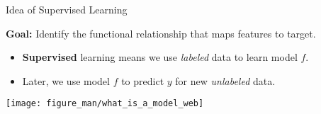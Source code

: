 \documentclass[11pt,compress,t,notes=noshow, xcolor=table]{beamer}
\begin{document}
	
\begin{vbframe}{Idea of Supervised Learning}


\textbf{Goal:} Identify the functional relationship that maps features to target.

\lz

\begin{itemize}

  \item \textbf{Supervised} learning means we use \emph{labeled} data to learn model $f$. %
  


  \item Later, we use model $f$ to predict $y$ for 
  new \emph{unlabeled} data. %
  
\end{itemize}

\begin{center}
  \texttt{[image: figure\_man/what\_is\_a\_model\_web]} 
\end{center}
\end{vbframe}

\framebreak 




\end{document}
